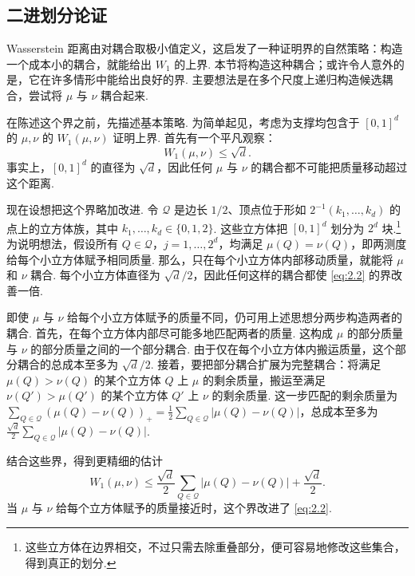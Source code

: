 \subsection{二进划分论证}\label{sec:2.2}
Wasserstein 距离由对耦合取极小值定义，这启发了一种证明界的自然策略：构造一个成本小的耦合，就能给出 $W_1$ 的上界. 本节将构造这种耦合；或许令人意外的是，它在许多情形中能给出良好的界. 主要想法是在多个尺度上递归构造候选耦合，尝试将 $\mu$ 与 $\nu$ 耦合起来.

在陈述这个界之前，先描述基本策略. 为简单起见，考虑为支撑均包含于 $[0,1]^d$ 的 $\mu,\nu$ 的 $W_1(\mu,\nu)$ 证明上界. 首先有一个平凡观察：
\begin{equation}\label{eq:2.2}W_1(\mu,\nu)\le\sqrt d.\end{equation}
事实上，$[0,1]^d$ 的直径为 $\sqrt d$，因此任何 $\mu$ 与 $\nu$ 的耦合都不可能把质量移动超过这个距离.

现在设想把这个界略加改进. 令 $\mathcal Q$ 是边长 $1/2$、顶点位于形如 $2^{-1}(k_1,\ldots,k_d)$ 的点上的立方体族，其中 $k_1,\ldots,k_d\in\{0,1,2\}$. 这些立方体把 $[0,1]^d$ 划分为 $2^d$ 块.\footnote{这些立方体在边界相交，不过只需去除重叠部分，便可容易地修改这些集合，得到真正的划分.} 为说明想法，假设所有 $Q\in\mathcal Q$，$j=1,\ldots,2^d$，均满足 $\mu(Q)=\nu(Q)$，即两测度给每个小立方体赋予相同质量. 那么，只在每个小立方体内部移动质量，就能将 $\mu$ 和 $\nu$ 耦合. 每个小立方体直径为 $\sqrt d/2$，因此任何这样的耦合都使 \eqref{eq:2.2} 的界改善一倍.

即使 $\mu$ 与 $\nu$ 给每个小立方体赋予的质量不同，仍可用上述思想分两步构造两者的耦合. 首先，在每个立方体内部尽可能多地匹配两者的质量. 这构成 $\mu$ 的部分质量与 $\nu$ 的部分质量之间的一个部分耦合. 由于仅在每个小立方体内搬运质量，这个部分耦合的总成本至多为 $\sqrt d/2$. 接着，要把部分耦合扩展为完整耦合：将满足 $\mu(Q)>\nu(Q)$ 的某个立方体 $Q$ 上 $\mu$ 的剩余质量，搬运至满足 $\nu(Q')>\mu(Q')$ 的某个立方体 $Q'$ 上 $\nu$ 的剩余质量. 这一步匹配的剩余质量为 $\sum_{Q\in\mathcal Q}(\mu(Q)-\nu(Q))_+=\frac12\sum_{Q\in\mathcal Q}|\mu(Q)-\nu(Q)|$，总成本至多为 $\frac{\sqrt d}2\sum_{Q\in\mathcal Q}|\mu(Q)-\nu(Q)|$.

结合这些界，得到更精细的估计
\begin{equation}\label{eq:2.3}
W_1(\mu,\nu)\le\frac{\sqrt d}2\sum_{Q\in\mathcal Q}|\mu(Q)-\nu(Q)|+\frac{\sqrt d}2.
\end{equation}
当 $\mu$ 与 $\nu$ 给每个立方体赋予的质量接近时，这个界改进了 \eqref{eq:2.2}.

